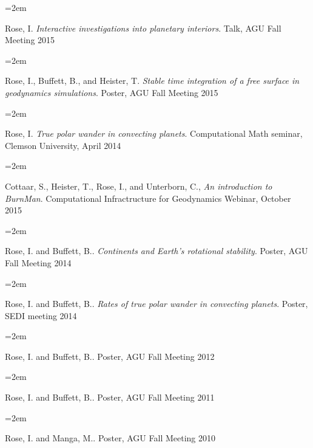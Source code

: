 \documentclass{scrartcl}
\newcommand{\Description}[1]{\hangindent=2em\hangafter=0\noindent\raggedright\footnotesize{#1}\par\normalsize\vspace{1em}} %
\begin{document}
\begin{cv}{}
\vspace{1em}


\vspace{1em} %

\Description{Rose, I. \textit{Interactive investigations into planetary interiors}. Talk, AGU Fall Meeting 2015}
\Description{Rose, I., Buffett, B., and Heister, T. \textit{Stable time integration of a free surface in geodynamics simulations}. Poster, AGU Fall Meeting 2015}
\Description{Rose, I. \textit{True polar wander in convecting planets}. Computational Math seminar, Clemson University, April 2014}
\Description{Cottaar, S., Heister, T., Rose, I., and Unterborn, C., \textit{An introduction to BurnMan}. Computational Infractructure for Geodynamics Webinar, October 2015}
\Description{Rose, I. and Buffett, B.. \textit{Continents and Earth's rotational stability}. Poster, AGU Fall Meeting 2014}
\Description{Rose, I. and Buffett, B.. \textit{Rates of true polar wander in convecting planets}. Poster, SEDI meeting 2014}
\Description{Rose, I. and Buffett, B.. \textit{} Poster, AGU Fall Meeting 2012}
\Description{Rose, I. and Buffett, B.. \textit{} Poster, AGU Fall Meeting 2011}
\Description{Rose, I. and Manga, M.. \textit{} Poster, AGU Fall Meeting 2010}


\end{cv}
\end{document}
